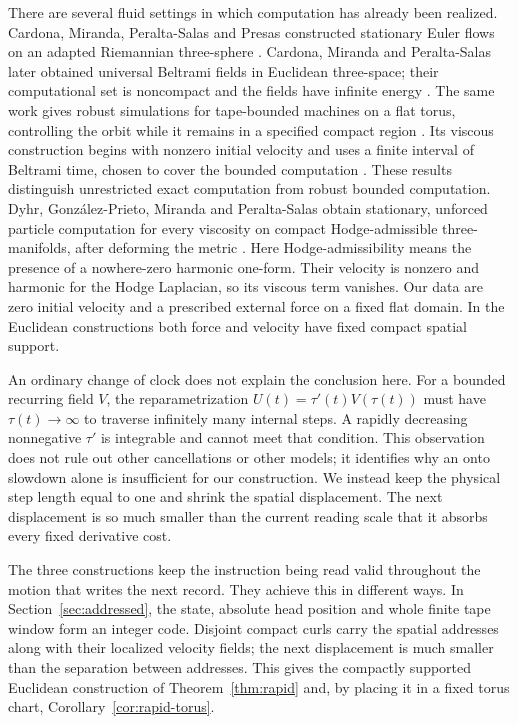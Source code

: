 \documentclass[11pt]{article}
\theoremstyle{remark}
\begin{document}
There are several fluid settings in which computation has already been
realized. Cardona, Miranda, Peralta-Salas and Presas constructed stationary
Euler flows on an adapted Riemannian three-sphere
\cite{CMPP}. Cardona, Miranda and Peralta-Salas later obtained universal
Beltrami fields in Euclidean three-space; their computational set is
noncompact and the fields have infinite energy
\cite[Theorem~1]{CMPBeltrami}. The same work gives robust simulations
for tape-bounded machines on a flat torus, controlling the orbit while
it remains in a specified compact region
\cite[Theorems~2 and~26]{CMPBeltrami}. Its viscous construction begins
with nonzero initial velocity and uses a finite interval of Beltrami
time, chosen to cover the bounded computation
\cite[Remark~29]{CMPBeltrami}. These results distinguish unrestricted
exact computation from robust bounded computation.
Dyhr, Gonz\'alez-Prieto, Miranda and Peralta-Salas obtain stationary,
unforced particle computation for every viscosity on compact
Hodge-admissible three-manifolds, after deforming the metric
\cite[Theorem~A]{DGMP}. Here Hodge-admissibility means the presence of a
nowhere-zero harmonic one-form. Their velocity is nonzero and harmonic
for the Hodge Laplacian, so its viscous term vanishes.
Our data are zero initial velocity and a prescribed external force on a
fixed flat domain. In the Euclidean constructions both force and velocity have
fixed compact spatial support.

An ordinary change of clock does not explain the conclusion here.
For a bounded recurring field $V$, the reparametrization
$U(t)=\tau'(t)V(\tau(t))$ must have $\tau(t)\to\infty$ to traverse
infinitely many internal steps. A rapidly decreasing nonnegative
$\tau'$ is integrable and cannot meet that condition. This observation
does not rule out other cancellations or other models; it identifies
why an onto slowdown alone is insufficient for our construction.
We instead keep the physical step length equal to one and shrink the
spatial displacement. The next displacement is so much smaller than
the current reading scale that it absorbs every fixed derivative cost.

The three constructions keep the instruction being read valid throughout
the motion that writes the next record. They achieve this in different
ways. In Section~\ref{sec:addressed}, the state, absolute head position
and whole finite tape window form an integer code. Disjoint compact curls
carry the spatial addresses along with their localized velocity fields;
the next displacement is much smaller than the separation between
addresses. This gives the compactly supported Euclidean construction
of Theorem~\ref{thm:rapid} and, by placing it in a fixed torus chart,
Corollary~\ref{cor:rapid-torus}.
\end{document}
